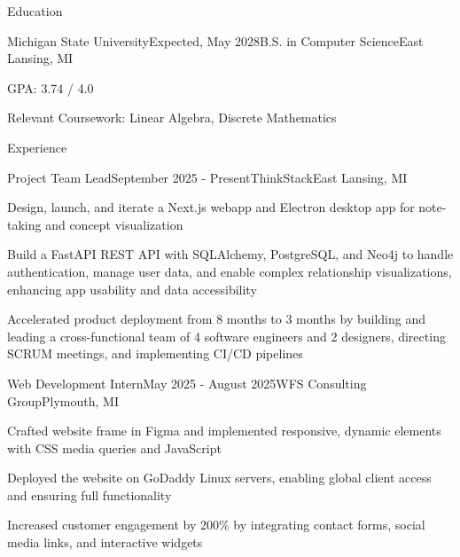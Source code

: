 \documentclass[
	11pt
]{resume}
\begin{document}
	\begin{rSection}{E}{ducation}
		\begin{rSectionEntry}{Michigan State University}{Expected, May 2028}{B.S. in Computer Science}{East Lansing, MI}
			\item GPA: 3.74 / 4.0
			\item Relevant Coursework: Linear Algebra, Discrete Mathematics
		\end{rSectionEntry}
	\end{rSection}

	\begin{rSection}{E}{xperience}
		\begin{rSectionEntry}{Project Team Lead}{September 2025 - Present}{ThinkStack}{East Lansing, MI}
			\item Design, launch, and iterate a Next.js webapp and Electron desktop app for note-taking and concept visualization
			\item Build a FastAPI REST API with SQLAlchemy, PostgreSQL, and Neo4j to handle authentication, manage user data, and enable complex relationship visualizations, enhancing app usability and data accessibility
			\item Accelerated product deployment from 8 months to 3 months by building and leading a cross-functional team of 4 software engineers and 2 designers, directing SCRUM meetings, and implementing CI/CD pipelines
		\end{rSectionEntry}

		\begin{rSectionEntry}{Web Development Intern}{May 2025 - August 2025}{WFS Consulting Group}{Plymouth, MI}
			\item Crafted website frame in Figma and implemented responsive, dynamic elements with CSS media queries and JavaScript
			\item Deployed the website on GoDaddy Linux servers, enabling global client access and ensuring full functionality
			\item Increased customer engagement by 200\% by integrating contact forms, social media links, and interactive widgets
		\end{rSectionEntry}
	\end{rSection}
\end{document}
